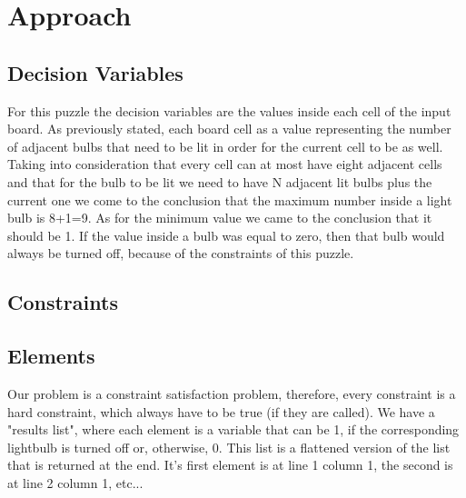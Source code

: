 \documentclass[runningheads]{llncs}
\begin{document}
\section{Approach}

\subsection{Decision Variables}
For this puzzle the decision variables are the values inside each cell of the input board. As previously stated, each board cell as a value representing the number of adjacent bulbs that need to be lit in order for the current cell to be as well.\hfill \break
Taking into consideration that every cell can at most have eight adjacent cells and that for the bulb to be lit we need to have N adjacent lit bulbs plus the current one we come to the conclusion that the maximum number inside a light bulb is 8+1=9. As for the minimum value we came to the conclusion that it should be 1. If the value inside a bulb was equal to zero, then that bulb would always be turned off, because of the constraints of this puzzle.

\subsection{Constraints}

\subsection{Elements}
Our problem is a constraint satisfaction problem, therefore, every constraint is a hard constraint, which always have to be true (if they are called).\hfill \break
We have a "results list", where each element is a variable that can be 1, if the corresponding lightbulb is turned off or, otherwise, 0. This list is a flattened version of the list that is returned at the end. It's first element is at line 1 column 1, the second is at line 2 column 1, etc...\hfill {}
\end{document}
